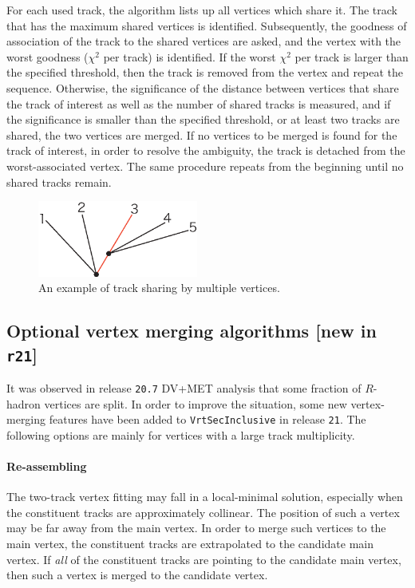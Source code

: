 \documentclass[NOTE, atlasdraft=true, texlive=2018, UKenglish]{\ATLASLATEXPATH atlasdoc}
\begin{document}
For each used track, the algorithm lists up all vertices which share it. The track that has the maximum shared vertices is identified. Subsequently, the goodness of association of the track to the shared vertices are asked, and the vertex with the worst goodness ($\chi^{2}$ per track) is identified. If the worst $\chi^{2}$ per track is larger than the specified threshold, then the track is removed from the vertex and repeat the sequence. Otherwise, the significance of the distance between vertices that share the track of interest as well as the number of shared tracks is measured, and if the significance is smaller than the specified threshold, or at least two tracks are shared, the two vertices are merged. If no vertices to be merged is found for the track of interest, in order to resolve the ambiguity, the track is detached from the worst-associated vertex. The same procedure repeats from the beginning until no shared tracks remain.

\begin{figure}[t]
\begin{center}
\includegraphics[width=0.47\textwidth]{figures/rearrange}
\caption{An example of track sharing by multiple vertices.}
\label{fig:rearrange}
\end{center}
\end{figure}

\subsection{Optional vertex merging algorithms [new in {\tt r21}]}\label{sec:merging}
It was observed in release {\tt 20.7} DV+MET analysis that some fraction of $R$-hadron vertices are split. In order to improve the situation, some new vertex-merging features have been added to {\tt VrtSecInclusive} in release {\tt 21}. The following options are mainly for vertices with a large track multiplicity.

\paragraph{Re-assembling}
The two-track vertex fitting may fall in a local-minimal solution, especially when the constituent tracks are approximately collinear. The position of such a vertex may be far away from the main vertex. In order to merge such vertices to the main vertex, the constituent tracks are extrapolated to the candidate main vertex. If \emph{all} of the constituent tracks are pointing to the candidate main vertex, then such a vertex is merged to the candidate vertex.
\end{document}
